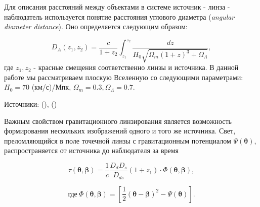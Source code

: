 Для описания расстояний между объектами в системе источник - линза - наблюдатель используется понятие расстояния углового диаметра (\textit{angular diameter distance}). Оно определяется следующим образом:

\begin{equation}\label{ang_dia_dist}
D_{A}\left(z_{1}, z_{2}\right)=\frac{c}{1+z_{2}} \int_{z_{1}}^{z_{2}} \frac{d z}{H_{0} \sqrt{\Omega_{m}\left(1+z\right)^{3}+\Omega_{\Lambda}}},
\end{equation}
где $z_1, z_2$ - красные смещения  соответственно линзы и источника. В данной работе мы рассматриваем плоскую Вселенную со следующими параметрами: $H_0=70$ (км/с)/Мпк, $\Omega_m=0.3, \Omega_\Lambda=0.7$.

Источники: (\cite{suyu2010}), (\cite{timedelaycosmography})

Важным свойством гравитационного линзирования является возможность формирования нескольких изображений одного и того же источника. Свет, преломляющийся в поле точечной линзы с гравитационным потенциалом $\Psi(\boldsymbol{\theta})$, распространяется от источника до наблюдателя за время

\begin{equation}\label{tau}
\tau(\boldsymbol{\theta}, \boldsymbol{\beta})=\frac{1}{c} \frac{D_{d} D_{s}}{D_{d s}} (1+z_1) \cdot \Phi(\boldsymbol{\theta},\boldsymbol{\beta}),
\end{equation}

\begin{equation}\label{fi}
\textrm{где} \ \Phi(\boldsymbol{\theta},\boldsymbol{\beta}) =  \left[\frac{1}{2}(\boldsymbol{\theta}-\boldsymbol{\beta})^{2}-\Psi(\boldsymbol{\theta})\right].
\end{equation}



